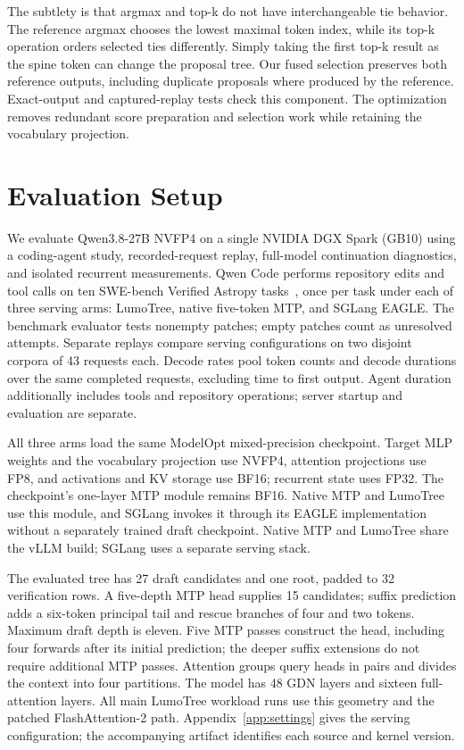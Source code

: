 \documentclass[conference]{IEEEtran}
\newcommand{\sys}{LumoTree}
\begin{document}
The subtlety is that argmax and top-k do not have interchangeable tie behavior. The reference argmax chooses the lowest maximal token index, while its top-k operation orders selected ties differently. Simply taking the first top-k result as the spine token can change the proposal tree. Our fused selection preserves both reference outputs, including duplicate proposals where produced by the reference. Exact-output and captured-replay tests check this component. The optimization removes redundant score preparation and selection work while retaining the vocabulary projection.



\section{Evaluation Setup}
\label{sec:protocol}
We evaluate Qwen3.8-27B NVFP4 on a single NVIDIA DGX Spark (GB10) using a coding-agent study, recorded-request replay, full-model continuation diagnostics, and isolated recurrent measurements. Qwen Code performs repository edits and tool calls on ten SWE-bench Verified Astropy tasks~\cite{jimenez2024swe}, once per task under each of three serving arms: \sys{}, native five-token MTP, and SGLang EAGLE. The benchmark evaluator tests nonempty patches; empty patches count as unresolved attempts. Separate replays compare serving configurations on two disjoint corpora of 43 requests each. Decode rates pool token counts and decode durations over the same completed requests, excluding time to first output. Agent duration additionally includes tools and repository operations; server startup and evaluation are separate.

All three arms load the same ModelOpt mixed-precision checkpoint. Target MLP weights and the vocabulary projection use NVFP4, attention projections use FP8, and activations and KV storage use BF16; recurrent state uses FP32. The checkpoint's one-layer MTP module remains BF16. Native MTP and \sys{} use this module, and SGLang invokes it through its EAGLE implementation without a separately trained draft checkpoint. Native MTP and \sys{} share the vLLM build; SGLang uses a separate serving stack.

The evaluated tree has 27 draft candidates and one root, padded to 32 verification rows. A five-depth MTP head supplies 15 candidates; suffix prediction adds a six-token principal tail and rescue branches of four and two tokens. Maximum draft depth is eleven. Five MTP passes construct the head, including four forwards after its initial prediction; the deeper suffix extensions do not require additional MTP passes. Attention groups query heads in pairs and divides the context into four partitions. The model has 48 GDN layers and sixteen full-attention layers. All main \sys{} workload runs use this geometry and the patched FlashAttention-2 path. Appendix~\ref{app:settings} gives the serving configuration; the accompanying artifact identifies each source and kernel version.
\end{document}
